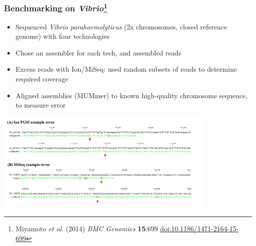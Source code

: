 \begin{frame}
  \frametitle{Benchmarking on \textit{Vibrio}\footnote{\tiny{Miyamoto \textit{et al}. (2014) \textit{BMC Genomics} \textbf{15}:699 \href{http://dx.doi.org/10.1186/1471-2164-15-699}{doi:10.1186/1471-2164-15-699}}}}
    \begin{itemize}
      \item Sequenced \textit{Vibrio parahaemolyticus} (2x chromosomes, closed reference genome) with four technologies
      \item Chose an assembler for each tech, and assembled reads
      \item Excess reads with Ion/MiSeq: used random subsets of reads to determine required coverage 
      \item Aligned assemblies (MUMmer) to known high-quality chromosome sequence, to measure error
    \end{itemize}      
    \begin{center}
      \includegraphics[width=0.8\textwidth]{images/miyamoto_errors}
    \end{center}      
\end{frame}

